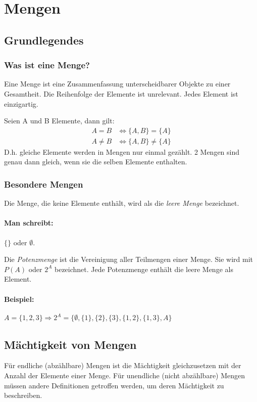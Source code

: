 \documentclass[a4paper,12pt, DIV12]{scrartcl}
\begin{document}
\section{Mengen}
\subsection{Grundlegendes}
\subsubsection*{Was ist eine Menge?}
Eine Menge ist eine Zusammenfassung unterscheidbarer Objekte zu einer
Gesamtheit. Die Reihenfolge der Elemente ist unrelevant. Jedes Element ist einzigartig.

Seien A und B Elemente, dann gilt:
\begin{align}
  A = B    &\Leftrightarrow \{A, B\} = \{A\} \\
  A \neq B &\Leftrightarrow \{A, B\} \neq \{A\}
\end{align}
D.h. gleiche Elemente werden in Mengen nur einmal gezählt.
2 Mengen sind genau dann gleich, wenn sie die selben Elemente
enthalten.
\subsubsection*{Besondere Mengen}
Die Menge, die keine Elemente enthält, wird als die \emph{leere Menge} bezeichnet.
\paragraph{Man schreibt:} $\{\}$ oder ${}\emptyset$.

Die \emph{Potenzmenge} ist die Vereinigung aller Teilmengen einer Menge.
Sie wird mit \(P(A)\) oder \(2^A\) bezeichnet. Jede Potenzmenge
enthält die leere Menge als Element.
\paragraph{Beispiel:}
\begin{math}
{A = \{1,2,3\} }
\Rightarrow{2^A = \{ \emptyset, \{1\},\{2\},\{3\},\{1,2\},\{1,3\},A \} }
\end{math}
\newpage
\subsection{Mächtigkeit von Mengen}
Für endliche (abzählbare) Mengen ist die Mächtigkeit gleichzusetzen mit der Anzahl
der Elemente einer Menge. Für unendliche (nicht abzählbare) Mengen müssen andere
Definitionen getroffen werden, um deren Mächtigkeit zu beschreiben.
\end{document}

